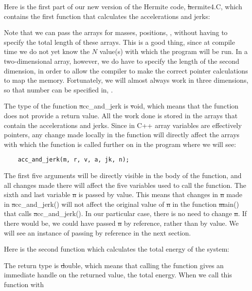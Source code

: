 Here is the first part of our new version of the Hermite code,
{\st hermite4.C}, which contains the first function that calculates
the accelerations and jerks:


Note that we can pass the arrays for masses, positions, \etc, without
having to specify the total length of these arrays.  This is a good
thing, since at compile time we do not yet know the $N$ value(s) with
which the program will be run.  In a two-dimensional array, however,
we do have to specify the length of the second dimension, in order to
allow the compiler to make the correct pointer calculations to map the
memory.  Fortunately, we will almost always work in three dimensions,
so that number can be specified in, .

The type of the function {\st acc\_and\_jerk} is {\st void}, which means
that the function does not provide a return value.  All the work done
is stored in the arrays that contain the accelerations and jerks.
Since in C++ array variables are effectively pointers, any change made
locally in the function will directly affect the arrays with which the
function is called further on in the program where we will see:

\begin{small}
\begin{verbatim}
    acc_and_jerk(m, r, v, a, jk, n);
\end{verbatim}
\end{small}

The first five arguments will be directly visible in the body of the
function, and all changes made there will affect the five variables
used to call the function.  The sixth and last variable {\st n} is
passed by value.  This means that changes in {\st n} made in {\st
acc\_and\_jerk()} will not affect the original value of {\st n} in the
function {\st main()} that calls {\st acc\_and\_jerk()}.  In our
particular case, there is no need to change {\st n}.  If there would
be, we could have passed {\st n} by reference, rather than by value.
We will see an instance of passing by reference in the next section.

Here is the second function which calculates the total energy of the system:


The return type is {\st double}, which means that calling the function
gives an immediate handle on the returned value, the total energy.  When
we call this function with

